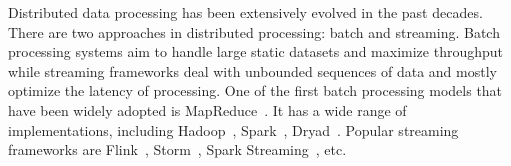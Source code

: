 

Distributed data processing has been extensively evolved in the past decades.
There are two approaches in distributed processing: batch and streaming.
Batch processing systems aim to handle large static datasets and maximize throughput while streaming frameworks deal with unbounded sequences of data and mostly optimize the latency of processing.
One of the first batch processing models that have been widely adopted is MapReduce~\cite{Dean:2008:MSD:1327452.1327492}.
It has a wide range of implementations, including Hadoop~\cite{hadoop2009hadoop}, Spark~\cite{Zaharia:2016:ASU:3013530.2934664}, Dryad~\cite{Isard:2007:DDD:1272996.1273005}.
Popular streaming frameworks are Flink~\cite{carbone2015apache}, Storm~\cite{Toshniwal:2014:STO:2588555.2595641}, Spark Streaming~\cite{Zaharia:2012:DSE:2342763.2342773}, etc.


